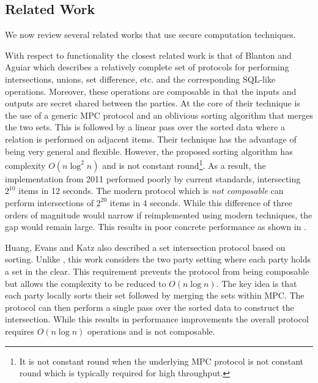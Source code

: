 \subsection{Related Work}
We now review several related works that use secure computation techniques.

With respect to functionality the closest related work is that of Blanton and Aguiar\cite{ASIACCS:BlaAgu12} which describes a relatively complete set of protocols for performing intersections, unions, set difference, etc. and the corresponding SQL-like operations. Moreover, these operations are composable in that the inputs and outputs are secret shared between the parties. At the core of their technique is the use of a generic MPC protocol and an oblivious sorting algorithm that merges the two sets. This is followed by a linear pass over the sorted data where a relation is performed on adjacent items. Their technique has the advantage of being very general and flexible. However, the proposed sorting algorithm has complexity $O(n \log^2 n)$ and is not constant round\footnote{It is not constant round when the underlying MPC protocol is not constant round which is typically required for high throughput.}. 
\iffullversion
As a result, the implementation from 2011 performed poorly by current standards, intersecting $2^{10}$ items in 12 seconds. The modern protocol \cite{CCS:KKRT16} which is \emph{not composable} can perform intersections of $2^{20}$ items in 4 seconds. While this difference of three orders of magnitude would narrow if reimplemented using modern techniques, the gap would remain large.
\else
This results in poor concrete performance as shown in .
\fi


\iffullversion
Huang, Evans and Katz\cite{HEK12} also described a set intersection protocol based on sorting. Unlike \cite{ASIACCS:BlaAgu12}, this work considers the two party setting where each party holds a set in the clear.
This requirement prevents the protocol from being composable but allows the complexity to be reduced to $O(n\log n)$. The key idea is that each party locally sorts their set followed by merging the sets within MPC. The protocol can then perform a single pass over the sorted data to construct the intersection. While this results in performance improvements the overall protocol requires  $O(n\log n)$ operations and is not composable.
\fi

